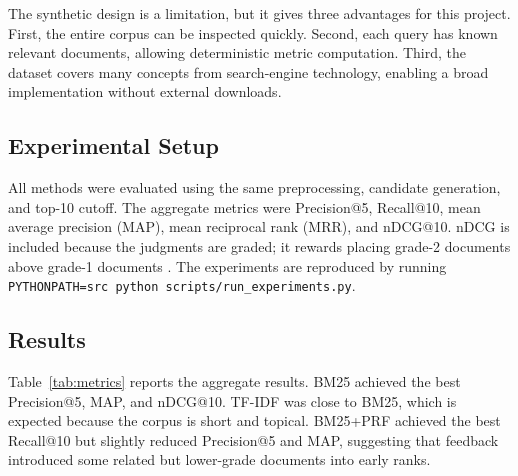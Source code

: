 \documentclass[sigconf,nonacm]{acmart}
\begin{document}
The synthetic design is a limitation, but it gives three advantages for this project. First, the entire corpus can be inspected quickly. Second, each query has known relevant documents, allowing deterministic metric computation. Third, the dataset covers many concepts from search-engine technology, enabling a broad implementation without external downloads.

\subsection{Experimental Setup}
All methods were evaluated using the same preprocessing, candidate generation, and top-10 cutoff. The aggregate metrics were Precision@5, Recall@10, mean average precision (MAP), mean reciprocal rank (MRR), and nDCG@10. nDCG is included because the judgments are graded; it rewards placing grade-2 documents above grade-1 documents \cite{jarvelin2002dcg}. The experiments are reproduced by running \texttt{PYTHONPATH=src python scripts/run\_experiments.py}.

\subsection{Results}
Table~\ref{tab:metrics} reports the aggregate results. BM25 achieved the best Precision@5, MAP, and nDCG@10. TF-IDF was close to BM25, which is expected because the corpus is short and topical. BM25+PRF achieved the best Recall@10 but slightly reduced Precision@5 and MAP, suggesting that feedback introduced some related but lower-grade documents into early ranks.

\begin{table}[t]
\centering
\caption{Aggregate retrieval metrics over 12 queries. Higher is better.}
\label{tab:metrics}
\end{table}
\end{document}
